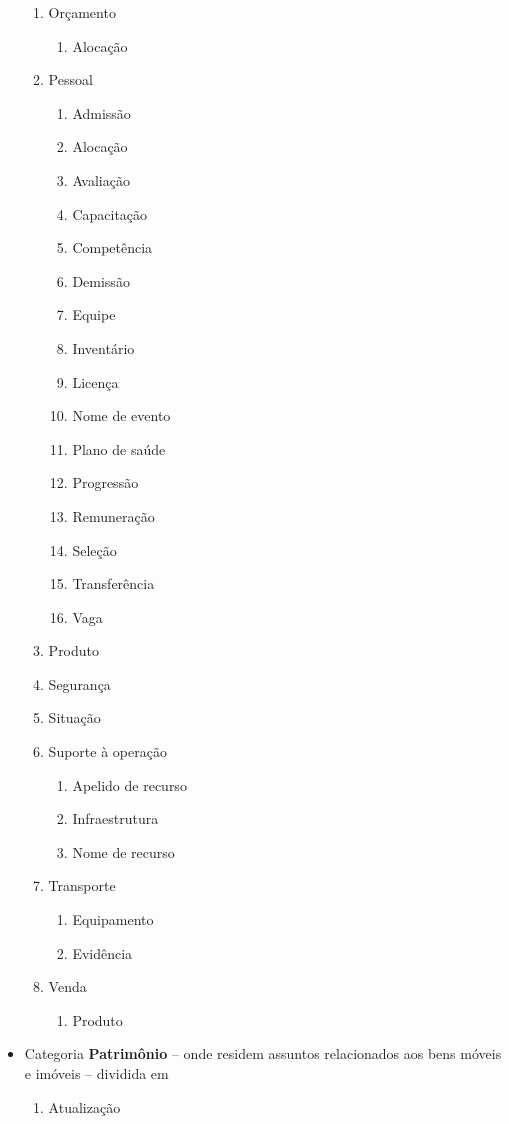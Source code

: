 \begin{multicols}{2}
\begin{itemize}
\begin{enumerate}
			\item Orçamento	\begin{enumerate}			
					\item Alocação	\end{enumerate}	
			\item Pessoal	\begin{enumerate}			
					\item Admissão		
					\item Alocação		
					\item Avaliação		
					\item Capacitação		
					\item Competência		
					\item Demissão		
					\item Equipe		
					\item Inventário		
					\item Licença		
					\item Nome de evento		
					\item Plano de saúde		
					\item Progressão		
					\item Remuneração		
					\item Seleção		
					\item Transferência		
					\item Vaga	\end{enumerate}	
			\item Produto				
			\item Segurança				
			\item Situação				
			\item Suporte à operação	\begin{enumerate}			
					\item Apelido de recurso		
					\item Infraestrutura		
					\item Nome de recurso	\end{enumerate}	
			\item Transporte	\begin{enumerate}			
					\item Equipamento		
					\item Evidência	\end{enumerate}	
			\item Venda	\begin{enumerate}			
					\item Produto	\end{enumerate}	
\end{enumerate}	\item Categoria \textbf{Patrimônio} -- onde residem assuntos relacionados aos bens móveis e imóveis -- dividida em	\begin{enumerate} 	\item Atualização				

\end{enumerate}
\end{itemize}
\end{multicols}
